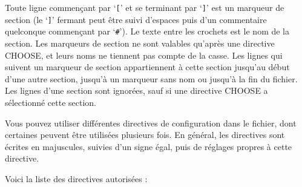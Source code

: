 \documentclass[titlepage]{article}
\begin{document}
Toute ligne commençant par `\texttt{[}' et se terminant par `\texttt{]}'
est un marqueur de section (le `\texttt{]}' fermant peut être suivi
d'espaces puis d'un commentaire quelconque commençant par `\texttt{\#}').
Le texte entre les crochets est le nom de la section.
Les marqueurs de section ne sont valables qu'après une directive CHOOSE, et leurs noms
ne tiennent pas compte de la casse.
Les lignes qui suivent un marqueur de section appartiennent à cette section jusqu'au
début d'une autre section, jusqu'à un marqueur sans nom ou jusqu'à la fin du fichier.
Les lignes d'une section sont ignorées, sauf si une directive CHOOSE a sélectionné
cette section.

Vous pouvez utiliser différentes directives de configuration dans le fichier, dont
certaines peuvent être utilisées plusieurs fois.
En général, les directives sont
écrites en majuscules, suivies d'un signe égal, puis de
réglages propres à cette directive.

Voici la liste des directives autorisées :
\end{document}
